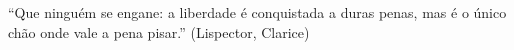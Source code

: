 \begin{epigrafe}
    \vspace*{\fill}
{%
	\noindent\hspace{.5\textwidth}
	{\begin{minipage}{.5\textwidth}
		\begin{flushright}
			``Que ninguém se engane: a liberdade é conquistada a duras penas, mas é o único chão onde vale a pena pisar.'' (Lispector, Clarice)
		\end{flushright}
	\end{minipage}}%
	\vspace*{3cm}
}%
\end{epigrafe}
